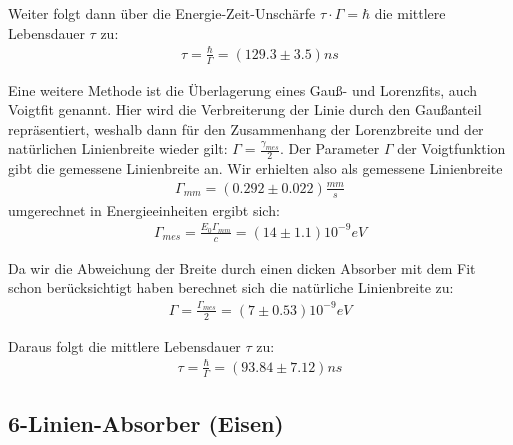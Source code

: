 \documentclass[12pt]{article}
\begin{document}
Weiter folgt dann über  die Energie-Zeit-Unschärfe $\tau \cdot \Gamma = \hbar$ die mittlere Lebensdauer $\tau$ zu:
\begin{align*}
 \tau = \frac{\hbar}{\Gamma} = (129.3 \pm 3.5)ns
\end{align*}

Eine weitere Methode ist die Überlagerung eines Gauß- und Lorenzfits, auch Voigtfit genannt. Hier wird die Verbreiterung der Linie durch den
Gaußanteil repräsentiert, weshalb dann für den Zusammenhang der Lorenzbreite und der natürlichen Linienbreite wieder gilt: $\Gamma = \frac{\gamma_{mes}}{2}$.
Der Parameter $\Gamma$ der Voigtfunktion gibt die gemessene Linienbreite an. Wir erhielten also als gemessene Linienbreite
\begin{align*}
 \Gamma_{mm} = (0.292 \pm 0.022) \frac{mm}{s}
\end{align*}
umgerechnet in Energieeinheiten ergibt sich:
\begin{align*}
 \Gamma_{mes} = \frac{E_0\Gamma_{mm}}{c} = (14 \pm 1.1) 10^{-9}eV
\end{align*}

Da wir die Abweichung der Breite durch einen dicken Absorber mit dem Fit schon berücksichtigt haben berechnet sich die natürliche Linienbreite zu:
\begin{align*}
 \Gamma = \frac{\Gamma_{mes}}{2} = (7 \pm 0.53) 10^{-9}eV
\end{align*}

Daraus folgt die mittlere Lebensdauer $\tau$ zu:
\begin{align*}
 \tau = \frac{\hbar}{\Gamma} = (93.84 \pm 7.12) ns
\end{align*}

\subsection{6-Linien-Absorber (Eisen)}
\end{document}
